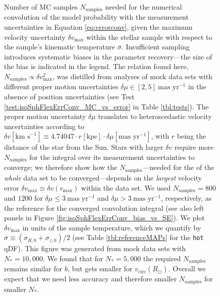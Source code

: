 \begin{figure}[!htbp]
\caption{Number of MC samples $N_\text{samples}$ needed for the numerical convolution of the model probability with the measurement uncertainties in Equation \ref{eq:errorconv}, given the maximum velocity uncertainty $\delta v_\text{max}$ within the stellar sample with respect to the sample's kinematic temperature $\bar{\sigma}$. Insufficient sampling introduces systematic biases in the parameter recovery---the size of the bias is indicated in the legend. The relation found here, $N_\text{samples} \propto \delta v_\text{max}^2$, was distilled from analyses of mock data sets with different proper motion uncertainties $\delta \mu \in [2,5]~\text{mas yr}^{-1}$ in the absence of position uncertainties (see Test \ref{test:isoSphFlexErrConv_MC_vs_error} in Table \ref{tbl:tests}). The proper motion uncertainty $\delta \mu$ translates to heteroscedastic velocity uncertainties according to $\delta v [\text{km s}^{-1}] \equiv 4.74047 \cdot r[\text{kpc}] \cdot \delta \mu [\text{mas yr}^{-1}]$, with $r$ being the distance of the star from the Sun. Stars with larger $\delta v$ require more $N_\text{samples}$ for the integral over its measurement uncertainties to converge; we therefore show how the $N_\text{samples}$---needed for the \pdf{} of the \emph{whole} data set to be converged---depends on the \emph{largest} velocity error $\delta v_\text{max} \equiv \delta v(r_\text{max})$ within the data set. We used $N_\text{samples} = 800$ and  $1200$ for $\delta \mu \leq 3~\text{mas yr}^{-1}$ and $\delta \mu > 3~\text{mas yr}^{-1}$, respectively, as the reference for the converged convolution integral (see also left panels in Figure \ref{fig:isoSphFlexErrConv_bias_vs_SE}). We plot $\delta v_\text{max}$ in units of the sample temperature, which we quantify by $\bar{\sigma} \equiv (\sigma_{R,0} + \sigma_{z,0})/2$ (see Table \ref{tbl:referenceMAPs} for the \texttt{hot} qDF). This figure was generated from mock data sets with $N_{*}=10,000$. We found that for $N_{*}=5,000$ the required $N_\text{samples}$ remains similar for $b$, but gets smaller for $v_\text{circ}(R_\odot)$. Overall we expect that we need less accuracy and therefore smaller $N_\text{samples}$ for smaller $N_{*}$. }
\label{fig:isoSphFlexErrConv_MC_vs_error}
\end{figure}



